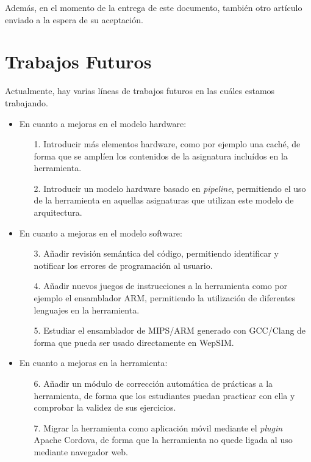 Además, en el momento de la entrega de este documento, también otro artículo enviado a la espera de su aceptación.

\section{Trabajos Futuros}

Actualmente, hay varias líneas de trabajos futuros en las cuáles estamos trabajando.

\begin{itemize}

\item En cuanto a mejoras en el modelo hardware:

\begin{itemize}

\item[1.] Introducir más elementos hardware, como por ejemplo una caché, de forma que se amplíen los contenidos de la asignatura incluídos en la herramienta.

\item[2.] Introducir un modelo hardware basado en \textit{pipeline}, permitiendo el uso de la herramienta en aquellas asignaturas que utilizan este modelo de arquitectura. 

\end{itemize}

\item En cuanto a mejoras en el modelo software:

\begin{itemize}

\item[3.] Añadir revisión semántica del código, permitiendo identificar y notificar los errores de programación al usuario.

\item[4.] Añadir nuevos juegos de instrucciones a la herramienta como por ejemplo el ensamblador ARM, permitiendo la utilización de diferentes lenguajes en la herramienta.

\item[5.] Estudiar el ensamblador de MIPS/ARM generado con GCC/Clang de forma que pueda ser usado directamente en WepSIM.

\end{itemize}

\item En cuanto a mejoras en la herramienta:

\begin{itemize}

\item[6.] Añadir un módulo de corrección automática de prácticas a la herramienta, de forma que los estudiantes puedan practicar con ella y comprobar la validez de sus ejercicios.

\item[7.] Migrar la herramienta como aplicación móvil mediante el \emph{plugin} Apache Cordova, de forma que la herramienta no quede ligada al uso mediante navegador web.

\end{itemize}

\end{itemize}

